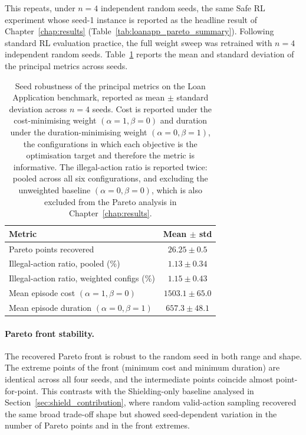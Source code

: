 This repeats, under $n=4$ independent random seeds, the same Safe
\ac{RL} experiment whose seed-1 instance is reported as the headline
result of Chapter~\ref{chap:results}
(Table~\ref{tab:loanapp_pareto_summary}). Following standard \ac{RL}
evaluation practice, the full weight sweep was retrained with $n=4$
independent random seeds.
Table~\ref{tab:seed_variance} reports the mean and standard deviation
of the principal metrics across seeds.

\begin{table}[H]
\centering
\caption{Seed robustness of the principal metrics on the Loan
Application benchmark, reported as mean $\pm$ standard deviation across
$n=4$ seeds. Cost is reported under the cost-minimising weight
$(\alpha{=}1,\beta{=}0)$ and duration under the duration-minimising
weight $(\alpha{=}0,\beta{=}1)$, the configurations in which each
objective is the optimisation target and therefore the metric is
informative. The illegal-action ratio is reported twice: pooled across
all six configurations, and excluding the unweighted baseline
$(\alpha{=}0,\beta{=}0)$, which is also excluded from the Pareto
analysis in Chapter~\ref{chap:results}.}
\label{tab:seed_variance}
{\renewcommand{\arraystretch}{1.5}
\setlength{\tabcolsep}{6pt}
\begin{tabular}{lc}
\toprule
\textbf{Metric} & \textbf{Mean $\pm$ std} \\
\midrule
Pareto points recovered            & $26.25 \pm 0.5$ \\
Illegal-action ratio, pooled (\%)  & $1.13 \pm 0.34$ \\
Illegal-action ratio, weighted configs (\%) & $1.15 \pm 0.43$ \\
Mean episode cost $(\alpha{=}1,\beta{=}0)$     & $1503.1 \pm 65.0$ \\
Mean episode duration $(\alpha{=}0,\beta{=}1)$ & $657.3 \pm 48.1$ \\
\bottomrule
\end{tabular}}
\end{table}

\paragraph{Pareto front stability.}

The recovered Pareto front is robust to the random seed in both range
and shape. The extreme points of the front (minimum cost and minimum
duration) are identical across all four seeds, and the intermediate
points coincide almost point-for-point. This contrasts with the
Shielding-only baseline analysed in Section~\ref{sec:shield_contribution},
where random valid-action sampling recovered the same broad trade-off shape but showed seed-dependent variation in the number of Pareto points and in the front extremes.


